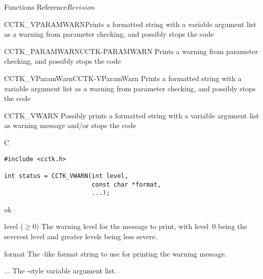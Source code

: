 \begin{cactuspart}{ Functions Reference}{}{$Revision$}
\begin{FunctionDescription}{CCTK\_VPARAMWARN}{Prints a formatted string with a
variable argument list as a warning from parameter checking, and possibly
stops the code}
\begin{SeeAlsoSection}
\begin{SeeAlso2}{CCTK\_PARAMWARN}{CCTK-PARAMWARN}
Prints a warning from parameter checking, and possibly stops the code
\end{SeeAlso2}
\begin{SeeAlso2}{CCTK\_VParamWarn}{CCTK-VParamWarn}
Prints a formatted string with a variable argument list as a warning from
parameter checking, and possibly stops the code
\end{SeeAlso2}
\end{SeeAlsoSection}
\end{FunctionDescription}


\begin{FunctionDescription}{CCTK\_VWARN}
\label{CCTK-VWARN}
Possibly prints a formatted string with a variable argument list as
warning message and/or stops the code

\begin{SynopsisSection}
\begin{Synopsis}{C}
\begin{verbatim}
#include <cctk.h>

int status = CCTK_VWARN(int level,
                        const char *format,
                        ...);
\end{verbatim}
\end{Synopsis}
\end{SynopsisSection}

\begin{ResultSection}
\begin{Result}{0}
ok%
\end{Result}
\end{ResultSection}

\begin{ParameterSection}
\begin{Parameter}{level ($\ge 0$)}
The warning level for the message to print, with level~0 being the
severest level and greater levels being less severe.
\end{Parameter}
\begin{Parameter}{format}
The -like format string to use for printing the warning message.
\end{Parameter}
\begin{Parameter}{...}
The -style variable argument list.
\end{Parameter}
\end{ParameterSection}


\end{FunctionDescription}
\end{cactuspart}
